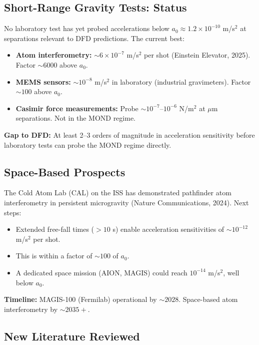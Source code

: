 \documentclass[11pt]{article}
\newcommand{\ee}[1]{\times 10^{#1}}
\newcommand{\aM}{a_0}
\begin{document}
\subsection{Short-Range Gravity Tests: Status}

No laboratory test has yet probed accelerations below $\aM \approx
1.2\ee{-10}$ m/s$^2$ at separations relevant to DFD predictions.
The current best:

\begin{itemize}
  \item \textbf{Atom interferometry:} $\sim 6\ee{-7}$ m/s$^2$
    per shot (Einstein Elevator, 2025). Factor $\sim 6000$ above
    $\aM$.
  \item \textbf{MEMS sensors:} $\sim 10^{-8}$ m/s$^2$ in laboratory
    (industrial gravimeters). Factor $\sim 100$ above $\aM$.
  \item \textbf{Casimir force measurements:} Probe
    $\sim 10^{-7}$--$10^{-6}$ N/m$^2$ at $\mu$m separations.
    Not in the MOND regime.
\end{itemize}

\textbf{Gap to DFD:} At least 2--3 orders of magnitude in
acceleration sensitivity before laboratory tests can probe the
MOND regime directly.

\subsection{Space-Based Prospects}

The Cold Atom Lab (CAL) on the ISS has demonstrated pathfinder
atom interferometry in persistent microgravity (Nature Communications,
2024). Next steps:
\begin{itemize}
  \item Extended free-fall times ($> 10$ s) enable acceleration
    sensitivities of $\sim 10^{-12}$ m/s$^2$ per shot.
  \item This is within a factor of $\sim 100$ of $\aM$.
  \item A dedicated space mission (AION, MAGIS) could reach
    $10^{-14}$ m/s$^2$, well below $\aM$.
\end{itemize}

\textbf{Timeline:} MAGIS-100 (Fermilab) operational by $\sim 2028$.
Space-based atom interferometry by $\sim 2035+$.

\subsection{New Literature Reviewed}
\end{document}
